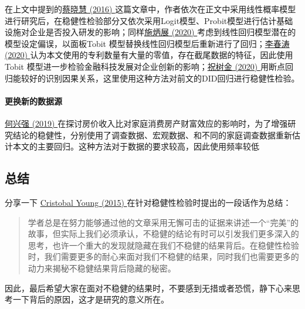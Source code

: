 \documentclass[11pt,a4paper]{ctexart}
\begin{document}
在上文中提到的\href{https://xueshu.baidu.com/usercenter/paper/show?paperid=0f2b233eb96ada98f02353ef66f55944&site=xueshu_se}{蔡晓慧
(2016)
}这篇文章中，作者依次在正文中采用线性概率模型进行研究后，在稳健性检验部分又依次采用Logit模型、Probit模型进行估计基础设施对企业是否投入研发的影响；同样\href{https://kns.cnki.net/KCMS/detail/detail.aspx?dbcode=CJFQ&dbname=CJFDLAST2020&filename=GLSJ202004014&v=MzAwNTF0Rnl6bFU3ck1JaUhZWkxHNEhOSE1xNDlFWtextbfSOGVYMUx1eFlTN0RoMVQzcVRyV00xRnJDVVI3cWZZT1I=}{施炳展
(2020) }考虑到线性回归模型潜在的模型设定偏误，以面板Tobit
模型替换线性回归模型后重新进行了回归；\href{https://xueshu.baidu.com/usercenter/paper/show?paperid=e116045880d5f16366d33f6da8e8dc66&site=xueshu_se}{李春涛
(2020)
}认为本文使用的专利数量有大量的零值，存在截尾数据的特征，因此使用Tobit
模型进一步检验金融科技发展对企业创新的影响；\href{https://kns.cnki.net/KCMS/detail/detail.aspx?dbcode=CJFQ&dbname=CJFDLAST2020&filename=GGYY202002008&uid=WEEvREcwSlJHSldRa1FhcTdnTnhYWUN1VlFpclJ3T21WZ1p5Qmg2RzNZRT0=$9A4hF_YAuvQ5obgVAqNKPCYcEjKensW4IQMovwHtwkF4VYPoHbKxJw!!&v=MTEzMTMzcVRyV00xRnJDVVI3cWZZT1JzRnlqblZidlBJaXJTZDdHNEhOSE1yWTlGYklSOGVYMUx1eFlTN0RoMVQ=}{祝树金
(2020)
}用断点回归能较好的识别因果关系，这里使用这种方法对前文的DID回归进行稳健性检验。

\paragraph{更换新的数据源}

\href{https://xueshu.baidu.com/usercenter/paper/show?paperid=73c2e7b7586fd92521ef9ffa47e54c82&site=xueshu_se}{何兴强
(2019)
}在探讨房价收入比对家庭消费房产财富效应的影响时，为了增强研究结论的稳健性，分别使用了调查数据、宏观数据、和不同的家庭调查数据重新估计本文的主要回归。这种方法对于数据的要求较高，因此使用频率较低

\subsection{总结}

分享一下
\href{https://web.stanford.edu/~cy10/public/mrobust/Model_Robustness.pdf}{Cristobal
Young (2015) }在针对稳健性检验时提出的一段话作为总结：

\begin{quote}
学者总是在努力能够通过他的文章采用无懈可击的证据来讲述一个``完美''的故事，但实际上我们必须承认，不稳健的结论有时可以引发我们更多深入的思考，也许一个重大的发现就隐藏在我们不稳健的结果背后。在稳健性检验时，我们需要更多的耐心来面对我们不稳健的结果，同时我们也需要更多的动力来揭秘不稳健结果背后隐藏的秘密。
\end{quote}

因此，最后希望大家在面对不稳健的结果时，不要感到无措或者恐慌，静下心来思考一下背后的原因，这才是研究的意义所在。
\end{document}
